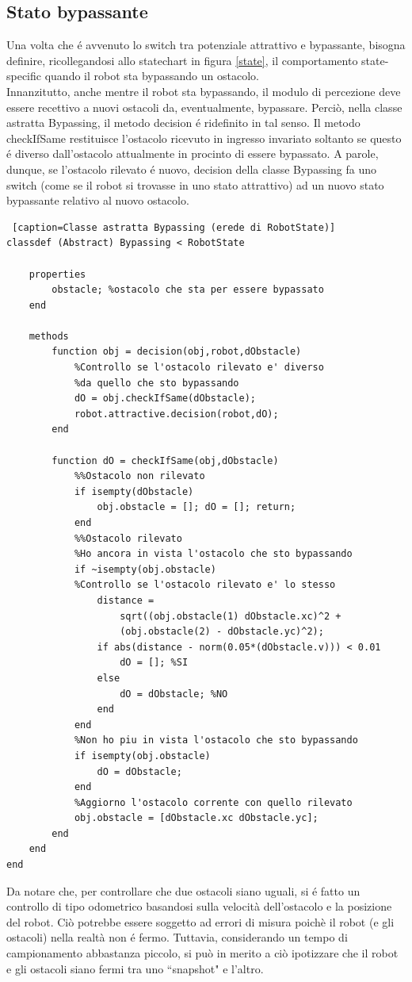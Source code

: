\documentclass[14pt,a4paper]{extarticle}
\begin{document}
\subsection{Stato bypassante}
Una volta che é avvenuto lo switch tra potenziale attrattivo e bypassante, bisogna definire, ricollegandosi allo statechart in figura \ref{state}, il comportamento state-specific quando il robot sta bypassando un ostacolo.\\ Innanzitutto, anche mentre il robot sta bypassando, il modulo di percezione deve essere recettivo a nuovi ostacoli da, eventualmente, bypassare. Perciò, nella classe astratta Bypassing, il metodo decision é ridefinito in tal senso. Il metodo checkIfSame restituisce l'ostacolo ricevuto in ingresso invariato soltanto se questo é diverso dall'ostacolo attualmente in procinto di essere bypassato. A parole, dunque, se l'ostacolo rilevato é nuovo, decision della classe Bypassing fa uno switch (come se il robot  si trovasse in uno stato attrattivo) ad un nuovo stato bypassante relativo al nuovo ostacolo.\\
\begin{lstlisting} [caption=Classe astratta Bypassing (erede di RobotState)]
classdef (Abstract) Bypassing < RobotState
    
	properties
		obstacle; %ostacolo che sta per essere bypassato
	end
    
	methods
		function obj = decision(obj,robot,dObstacle)
			%Controllo se l'ostacolo rilevato e' diverso
			%da quello che sto bypassando
			dO = obj.checkIfSame(dObstacle);
			robot.attractive.decision(robot,dO);
		end
        
		function dO = checkIfSame(obj,dObstacle)
			%%Ostacolo non rilevato
			if isempty(dObstacle)
				obj.obstacle = []; dO = []; return;
			end
			%%Ostacolo rilevato
			%Ho ancora in vista l'ostacolo che sto bypassando
			if ~isempty(obj.obstacle)
			%Controllo se l'ostacolo rilevato e' lo stesso
				distance = 
					sqrt((obj.obstacle(1) dObstacle.xc)^2 +
					(obj.obstacle(2) - dObstacle.yc)^2);
				if abs(distance - norm(0.05*(dObstacle.v))) < 0.01
					dO = []; %SI
				else
					dO = dObstacle; %NO
				end
			end
			%Non ho piu in vista l'ostacolo che sto bypassando
			if isempty(obj.obstacle)
				dO = dObstacle;
			end
			%Aggiorno l'ostacolo corrente con quello rilevato
			obj.obstacle = [dObstacle.xc dObstacle.yc];
		end
	end
end
\end{lstlisting}
\begin{nota}
Da notare che, per controllare che due ostacoli siano uguali, si é fatto un controllo di tipo odometrico basandosi sulla velocità dell'ostacolo e la posizione del robot. Ciò potrebbe essere soggetto ad errori di misura poichè il robot (e gli ostacoli) nella realtà non é fermo. Tuttavia, considerando un tempo di campionamento abbastanza piccolo, si può in merito a ciò ipotizzare che il robot e gli ostacoli siano fermi tra uno ``snapshot" e l'altro.
\end{nota}
\end{document}
